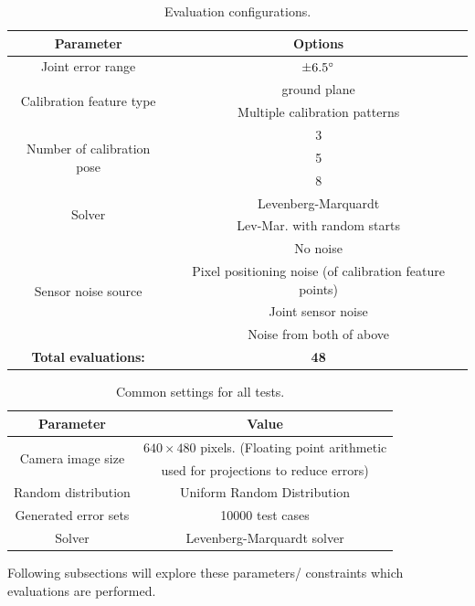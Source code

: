 \documentclass[english, printversion, nomenclature, notitle]{tuvisionthesis} %
\begin{document}
\begin{table}[]
	\centering
	\begin{tabular}{@{}cc@{}}
		\toprule
		\textbf{Parameter} & \textbf{Options} \\ \midrule
		Joint error range & $\pm 6.5\degree$ \\ \midrule
		\multirow{2}{*}{Calibration feature type} 
		& ground plane \\ 
		& Multiple calibration patterns \\  \midrule
		\multirow{3}{*}{Number of calibration pose}
		&3\\ 
		&5\\ 
		&8\\ \midrule
		\multirow{2}{*}{Solver} & Levenberg-Marquardt\\
		& Lev-Mar. with random starts\\ \midrule
		\multirow{4}{*}{Sensor noise source}
		& No noise \\
		& Pixel positioning noise (of calibration feature points) \\
		& Joint sensor noise\\
		& Noise from both of above \\ \midrule
		\textbf{Total evaluations:} 
		& \textbf{48} \\ \bottomrule\bottomrule
	\end{tabular}
	\caption{Evaluation configurations.}
	\label{tab:calib_test_configs}
\end{table}

\begin{table}[]
	\centering
	\begin{tabular}{@{}cc@{}}
		\toprule
		\textbf{Parameter} & \textbf{Value} \\ \midrule
		\multirow{2}{*}{Camera image size}
			& $640 \times 480$ pixels. (Floating point arithmetic \\
			&used for projections to reduce errors) \\ \midrule
		Random distribution & Uniform Random Distribution \\ \midrule
		Generated error sets & 10000 test cases \\ \midrule
		Solver & Levenberg-Marquardt solver\\ \bottomrule
	\end{tabular}
	\caption{Common settings for all tests.}
	\label{tab:calib_test_configs_common}
\end{table}


Following subsections will explore these parameters/ constraints which evaluations are performed.
\end{document}

